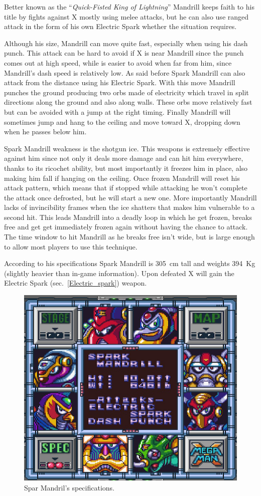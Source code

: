 Better known as the ``\textit{Quick-Fisted King of Lightning}'' Mandrill keeps faith to his title by fights against X mostly using melee attacks, but he can also use ranged attack in the form of his own Electric Spark whether the situation requires.

Although his size, Mandrill can move quite fast, especially when using his dash punch. This attack can be hard to avoid if X is near Mandrill since the punch comes out at high speed, while is easier to avoid when far from him, since Mandrill's dash speed is relatively low.  As said before Spark Mandrill can also attack from the distance using his Electric Spark. With this move Mandrill punches the ground producing two orbs made of electricity which travel in split directions along the ground and also along walls. These orbs move relatively fast but can be avoided with a jump at the right timing. Finally Mandrill will sometimes jump and hang to the ceiling and move toward X, dropping down when he passes below him. 

Spark Mandrill weakness is the shotgun ice. This weapons is extremely effective against him since not only it deals more damage and can hit him everywhere, thanks to its ricochet ability, but most importantly it freezes him in place, also making him fall if hanging on the ceiling. Once frozen Mandrill will reset his attack pattern, which means that if stopped while attacking he won't complete the attack once defrosted, but he will start a new one. More importantly Mandrill lacks of invincibility frames when the ice shatters that makes him vulnerable to a second hit. This leads Mandrill into a deadly loop in which he get frozen, breaks free and get get immediately frozen again without having the chance to attack. The time window to hit Mandrill as he breaks free isn't wide, but is large enough to allow most players to use this technique. 

According to his specifications Spark Mandrill is 305~cm tall and weights 394~Kg (slightly heavier than in-game information). Upon defeated X will gain the Electric Spark (sec.~\ref{Electric_spark}) weapon.

\begin{figure}[htp]
	\centering
	\includegraphics[width=0.4\linewidth]{figures/X1/Spark_mandrill/Spark_mandril_specs.png}
	\caption{Spar Mandril's specifications.}
\end{figure}

